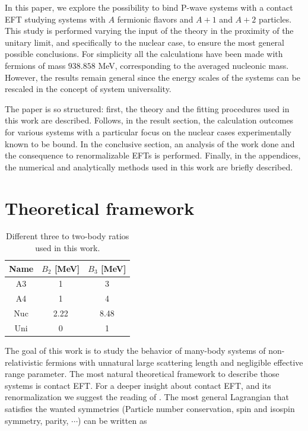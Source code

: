 \documentclass[preprint,12pt]{elsarticle}
\begin{document}
In this paper, we explore the possibility to bind P-wave systems with a contact EFT studying systems with $A$ fermionic flavors and $A+1$ and $A+2$ particles.
This study is performed varying the input of the theory in the proximity of the unitary limit, and specifically to the nuclear case, to ensure the most general possible conclusions.
For simplicity all the calculations have been made with fermions of mass $938.858$ MeV, corresponding to the averaged nucleonic mass.
However, the results remain general since the energy scales of the systems can be rescaled in the concept of system universality.

The paper is so structured: first, the theory and the fitting procedures used in this work are described. Follows, in the result section, the calculation outcomes for various systems with a particular focus on the nuclear cases experimentally known to be bound. In the conclusive section, an analysis of the work done and the consequence to renormalizable EFTs is performed. Finally, in the appendices, the numerical and analytically methods used in this work are briefly described.

\newpage %
\section{Theoretical framework}

\begin{table}
\caption{Different three to two-body ratios used in this work.}\label{tab:configurations}
\centering
\begin{tabular}{ccc}\\  
Name & $B_2$ [MeV] & $B_3$ [MeV]\\\midrule
A3  &1 & 3\\  \midrule
A4  &1 & 4\\  \midrule
Nuc &2.22 & 8.48\\  \midrule
Uni &0 & 1\\  \bottomrule
\end{tabular}
\end{table} 

The goal of this work is to study the behavior of many-body systems of non-relativistic fermions with unnatural large scattering length and negligible effective range parameter. 
The most natural theoretical framework to describe those systems is contact EFT. 
For a deeper insight about contact EFT, and its renormalization we suggest the reading of \cite{Lepage:1997cs,vanKolck:1999mw, Bedaque:1998kg, Braaten:2004rn, Hammer:2017tjm, Hammer:2019poc}.
The most general Lagrangian that satisfies the wanted symmetries (Particle number conservation, spin and isospin symmetry, parity, $\cdots$) can be written as
\end{document}
